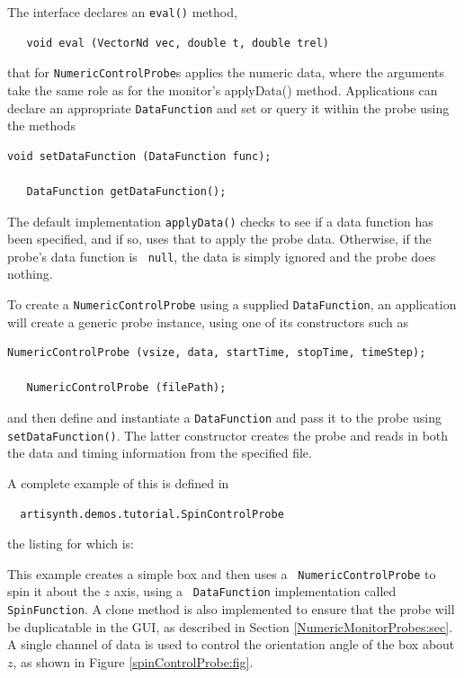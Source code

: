 The  interface
declares an {\tt eval()} method,
%
\begin{verbatim}
   void eval (VectorNd vec, double t, double trel)
\end{verbatim}
%
that for 
{\tt NumericControlProbe}s applies the numeric data, 
where the arguments take the same role as for the monitor's %
{applyData()}
method. Applications can declare an appropriate {\tt DataFunction} and
set or query it within the probe using the methods
\begin{lstlisting}[]
   void setDataFunction (DataFunction func);

   DataFunction getDataFunction();
\end{lstlisting}
%
The default implementation {\tt applyData()} checks to see
if a data function has been specified, and if so, uses that to
apply the probe data. Otherwise, if the probe's data function is {\tt
null}, the data is simply ignored and the probe does nothing.

To create a {\tt NumericControlProbe} using a supplied {\tt DataFunction},
an application will create a generic probe instance, using one
of its constructors such as 
\begin{lstlisting}[]
   NumericControlProbe (vsize, data, startTime, stopTime, timeStep);

   NumericControlProbe (filePath);
\end{lstlisting}
%
and then define and instantiate a {\tt DataFunction} and pass it to
the probe using {\tt setDataFunction()}. The latter constructor
creates the probe and reads in both the data and timing information
from the specified file.

A complete example
of this is defined in
%
\begin{verbatim}
  artisynth.demos.tutorial.SpinControlProbe
\end{verbatim}
%
the listing for which is:

\lstset{numbers=left}

\lstset{numbers=none}

This example creates a simple box and then uses a {\tt
NumericControlProbe} to spin it about the $z$ axis, using a {\tt
DataFunction} implementation called {\tt SpinFunction}. A clone method
is also implemented to ensure that the probe will be duplicatable in
the GUI, as described in Section \ref{NumericMonitorProbes:sec}.  A
single channel of data is used to control the orientation angle of the
box about $z$, as shown in Figure \ref{spinControlProbe:fig}.

